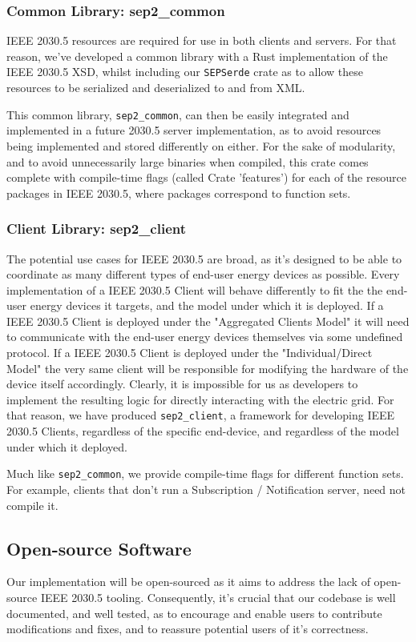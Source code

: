\subsubsection{Common Library: \- sep2\_common}
IEEE 2030.5 resources are required for use in both clients and servers. For that reason, we've developed a common library with a Rust implementation of the IEEE 2030.5 XSD, whilst including our \texttt{SEPSerde} crate as to allow these resources to be serialized and deserialized to and from XML.

This common library, \texttt{sep2\_common}, can then be easily integrated and implemented in a future 2030.5 server implementation, as to avoid resources being implemented and stored differently on either. 
For the sake of modularity, and to avoid unnecessarily large binaries when compiled, this crate comes complete with compile-time flags (called Crate 'features') for each of the resource packages in IEEE 2030.5, where packages correspond to function sets.

\subsubsection{Client Library: \- sep2\_client}
The potential use cases for IEEE 2030.5 are broad, as it's designed to be able to coordinate as many different types of end-user energy devices as possible.
Every implementation of a IEEE 2030.5 Client will behave differently to fit the the end-user energy devices it targets, and the model under which it is deployed. 
If a IEEE 2030.5 Client is deployed under the "Aggregated Clients Model" it will need to communicate with the end-user energy devices themselves via some undefined protocol.
If a IEEE 2030.5 Client is deployed under the "Individual/Direct Model" the very same client will be responsible for modifying the hardware of the device itself accordingly. 
Clearly, it is impossible for us as developers to implement the resulting logic for directly interacting with the electric grid.
For that reason, we have produced \texttt{sep2\_client}, a framework for developing IEEE 2030.5 Clients, regardless of the specific end-device, and regardless of the model under which it deployed.

Much like \texttt{sep2\_common}, we provide compile-time flags for different function sets. For example, clients that don't run a Subscription / Notification server, need not compile it.

\subsection{Open-source Software}
Our implementation will be open-sourced as it aims to address the lack of open-source IEEE 2030.5 tooling. Consequently, it's crucial that our codebase is well documented, and well tested, as to encourage and enable users to contribute modifications and fixes, and to reassure potential users of it's correctness.

